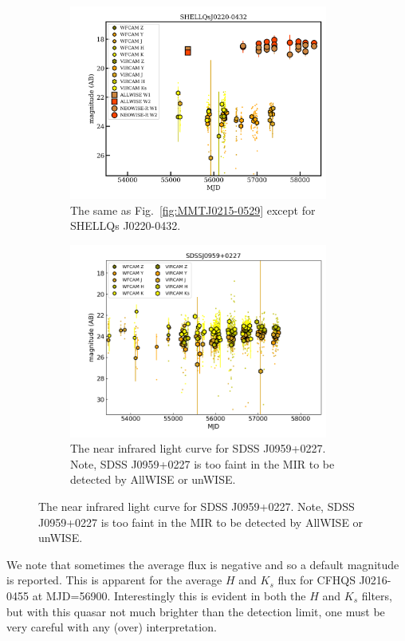 \documentclass[usenatbib]{mnras}
\begin{document}
\begin{figure}
  \begin{subfigure}{}\quad
    \centering
    \includegraphics[width=8.5cm]{figures/SHELLQsJ0220-0432LC_20190613.png}
    \caption{The same as Fig.~\ref{fig:MMTJ0215-0529} except for SHELLQs J0220-0432.}
    \label{fig:SHELLQsJ0220-0432}
  \end{subfigure}
  \begin{subfigure}{}\quad
    \centering
    \includegraphics[width=8.5cm]{figures/SDSSJ0959+0227LC_20190612.png}
        \caption{The near infrared light curve for SDSS J0959+0227. Note, 
      SDSS J0959+0227 is too faint in the MIR to be detected by AllWISE or unWISE.}
    \label{fig:SDSSJ0959+0227}
  \end{subfigure}
  \medskip
\end{figure}

We note that sometimes the average flux is negative and so a default
magnitude is reported.  This is apparent for the average $H$ and
$K_{s}$ flux for CFHQS J0216-0455 at MJD=56900.  Interestingly this is
evident in both the $H$ and $K_{s}$ filters, but with this quasar not
much brighter than the detection limit, one must be very careful with
any (over) interpretation.
\end{document}
